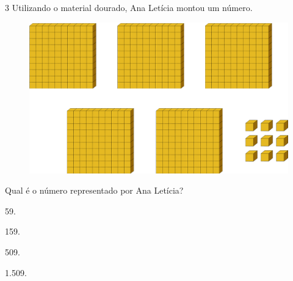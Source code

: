\num{3} Utilizando o material dourado, Ana Letícia montou um número.

\begin{figure}[htpb!]
\centering
\includegraphics[width=\textwidth]{./media/image9.png}
\end{figure}

Qual é o número representado por Ana Letícia? 

\begin{escolha}
  \begin{multicols}{2}
\item
  59.
\item
  159.
\item
  509.
\item
  1.509.
  \end{multicols}
\end{escolha}

